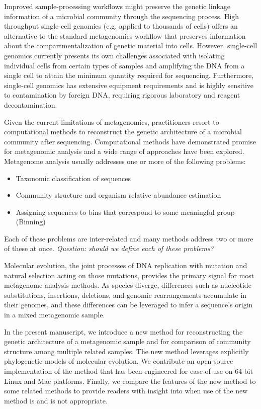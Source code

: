 \documentclass[10pt]{article}
\begin{document}
Improved sample-processing workflows might preserve the genetic linkage information of a microbial community through the sequencing process.
High throughput single-cell genomics (e.g. applied to thousands of cells) offers an alternative to the standard metagenomics workflow that preserves information about the compartmentalization of genetic material into cells. 
However, single-cell genomics currently presents its own challenges associated with isolating individual cells from certain types of samples and amplifying the {DNA} from a single cell to attain the minimum quantity required for sequencing. 
Furthermore, single-cell genomics has extensive equipment requirements and is highly sensitive to contamination by foreign DNA, requiring rigorous laboratory and reagent decontamination.

Given the current limitations of metagenomics, practitioners resort to computational methods to reconstruct the genetic architecture of a microbial community after sequencing.
Computational methods have demonstrated promise for metagenomic analysis and a wide range of approaches have been explored.
Metagenome analysis usually addresses one or more of the following problems:
\begin{itemize}
\item Taxonomic classification of sequences
\item Community structure and organism relative abundance estimation
\item Assigning sequences to bins that correspond to some meaningful group (Binning)
\end{itemize}
Each of these problems are inter-related and many methods address two or more of these at once.
\textit{Question: should we define each of these problems?}

Molecular evolution, the joint processes of DNA replication with mutation and natural selection acting on those mutations, provides the primary signal for most metagenome analysis methods.
As species diverge, differences such as nucleotide substitutions, insertions, deletions, and genomic rearrangements accumulate in their genomes, and these differences can be leveraged to infer a sequence's origin in a mixed metagenomic sample.

In the present manuscript, we introduce a new method for reconstructing the genetic architecture of a metagenomic sample and for comparison of community structure among multiple related samples.
The new method leverages explicitly phylogenetic models of molecular evolution. 
We contribute an open-source implementation of the method that has been engineered for ease-of-use on 64-bit Linux and Mac platforms.
Finally, we compare the features of the new method to some related methods to provide readers with insight into when use of the new method is and is not appropriate.
\end{document}
